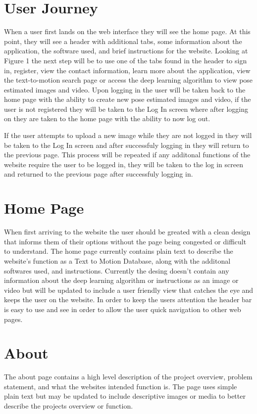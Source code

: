 \documentclass{scrreprt}
\begin{document}
\section{User Journey}
When a user first lands on the web interface they will see the home page. At this point, they will see a header with additional tabs, some information about the application, the software used, and brief instructions for the website. Looking at Figure 1 the next step will be to use one of the tabs found in the header to sign in, register, view the contact information, learn more about the application, view the text-to-motion search page or access the deep learning algorithm to view pose estimated images and video. Upon logging in the user will be taken back to the home page with the ability to create new pose estimated images and video, if the user is not registered they will be taken to the Log In screen where after logging on they are taken to the home page with the ability to now log out.

If the user attempts to upload a new image while they are not logged in they will be taken to the Log In screen and after successfuly logging in they will return to the previous page. This process will be repeated if any additonal functions of the website require the user to be logged in, they will be taken to the log in screen and returned to the previous page after successfuly logging in.

\section{Home Page}
When first arriving to the website the user should be greated with a clean design that informs them of their options without the page being congested or difficult to understand. The home page currently contains plain text to describe the website's function as a Text to Motion Database, along with the additonal softwares used, and instructions. Currently the desing doesn't contain any information about the deep learning algorithm or instructions as an image or video but will be updated to include a user friendly view that catches the eye and keeps the user on the website. In order to keep the users attention the header bar is easy to use and see in order to allow the user quick navigation to other web pages.

\section{About}
The about page contains a high level description of the project overview, problem statement, and what the websites intended function is. The page uses simple plain text but may be updated to include descriptive images or media to better describe the projects overview or function.
\end{document}
